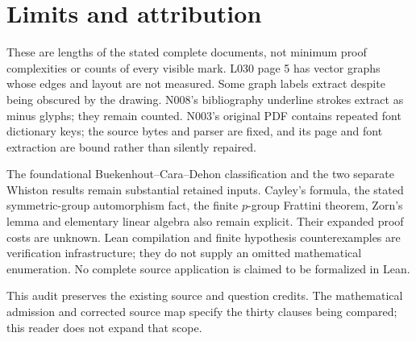 \documentclass[11pt,a4paper]{article}
\begin{document}
\section*{Limits and attribution}
These are lengths of the stated complete documents, not minimum proof
complexities or counts of every visible mark. L030 page 5 has vector graphs
whose edges and layout are not measured. Some graph labels extract despite
being obscured by the drawing. N008's bibliography underline strokes
extract as minus glyphs; they remain counted. N003's original PDF contains
repeated font dictionary keys; the source bytes and parser are fixed, and
its page and font extraction are bound rather than silently repaired.

The foundational Buekenhout--Cara--Dehon classification and the two
separate Whiston results remain substantial retained inputs. Cayley's
formula, the stated symmetric-group automorphism fact, the finite
$p$-group Frattini theorem, Zorn's lemma and elementary linear algebra
also remain explicit. Their expanded proof costs are unknown. Lean
compilation and finite hypothesis counterexamples are verification
infrastructure; they do not supply an omitted mathematical enumeration.
No complete source application is claimed to be formalized in Lean.

This audit preserves the existing source and question credits. The
mathematical admission and corrected source map specify the thirty
clauses being compared; this reader does not expand that scope.
\end{document}
